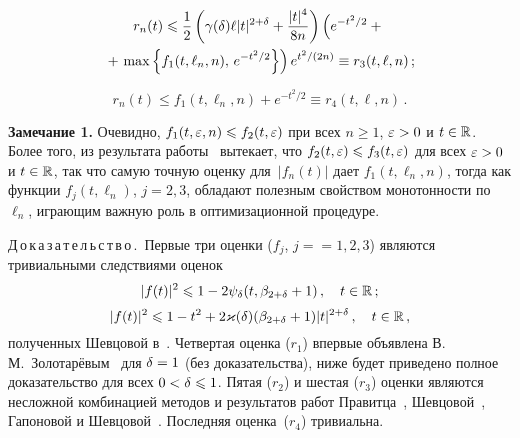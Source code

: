 \begin{multicols}{2}
\vspace*{-9pt}

\noindent
\begin{multline*}
r_n(t)\leqslant  \displaystyle\frac{\displaystyle 1\mathstrut}{\displaystyle 2\mathstrut}\left(\gamma(\delta){\ell|t|^{2+\delta}}+\displaystyle\frac{\displaystyle |t|^4\mathstrut}{\displaystyle 8n\mathstrut}\right)
\left(
e^{-t^2/2}+{}\right.\\
{}+\left.\max\left\{f_1(t,\ell_n,n),\,e^{-t^2/2}\right\}\right)
e^{t^2/(2n)}\equiv r_3(t,\ell,n)\,;
\end{multline*}

\vspace*{-3pt}

\noindent
$$
r_n(t)\le f_1(t,\ell_n,n)+e^{-t^2/2}\equiv r_4(t,\ell,n)\,.
$$

\medskip

\noindent
\textbf{Замечание 1.}
Очевидно, $f_1(t,\varepsilon,n)\leqslant f_2(t,\varepsilon)$ при всех $n\ge1$, $\varepsilon>0$
и $t\in\mathbb R$. Более того, из результата работы~\cite{Shevtsova2009}
вытекает, что $f_2(t,\varepsilon)\leqslant f_3(t,\varepsilon)$ для всех $\varepsilon>0$ и
$t\in\mathbb R$, так что самую точную оценку для~$|f_n(t)|$ дает 
$f_1(t,\ell_n,n)$, тогда как функции $f_j(t,\ell_n)$, $j=2,3$,
обладают полезным свойством монотонности по~$\ell_n$, играющим
важную роль в оптимизационной процедуре.

\medskip

\noindent
Д\,о\,к\,а\,з\,а\,т\,е\,л\,ь\,с\,т\,в\,о\,.\
Первые три оценки ($f_j$, $j=$\linebreak $=1,2,3$) являются тривиальными
следствиями оценок
$$
|f(t)|^2\leqslant 1-2\psi_\delta(t,\beta_{2+\delta}+1)\,,\quad t\in\mathbb R\,;
$$
$$
|f(t)|^2\leqslant 1-t^2 + 2\varkappa(\delta)(\beta_{2+\delta}+1)|t|^{2+\delta}\,,\quad t\in\mathbb R\,,
$$
полученных Шевцовой в~\cite{Shevtsova2009}. Четвертая оценка ($r_1$)
впервые объявлена В.\,М.~Зо\-ло\-та\-рё\-вым~\cite{Zolotarev1966}
для $\delta=1$ (без доказательства), ниже будет приведено полное
доказательство для всех $0<\delta\leqslant1$. Пятая ($r_2$) и шестая ($r_3$)
оценки являются несложной комбинацией методов и результатов работ
Правитца~\cite{Prawitz1975}, Шевцовой~\cite{Shevtsova2009},
Гапоновой и Шевцовой~\cite{GaponovaShevtsova2009}. Последняя 
оценка~($r_4$) тривиальна.


\end{multicols}
